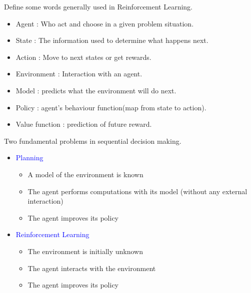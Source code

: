 \documentclass[landscape]{article}
\def\tcb{\textcolor{blue}}
\begin{document}
\newpage
\newvgtitle{\tcb{Terminology}}
\LARGE
\vspace{-.5em}
Define some words generally used in Reinforcement Learning.
\begin{itemize}
    \item Agent : Who act and choose in a given problem situation.
    \item State : The information used to determine what happens next.
    \item Action : Move to next states or get rewards.
    \item Environment : Interaction with an agent.
    \item Model : predicts what the environment will do next.
    \item Policy : agent’s behaviour function(map from state to action).
    \item Value function : prediction of future reward.
\end{itemize}
\newpage
\newvgtitle{\tcb{Learning and Planning}}
\LARGE
\vspace{-.5em}
Two fundamental problems in sequential decision making.
\vspace{0.5cm}
\begin{itemize}
    \item \huge \tcb{Planning}
    \LARGE
    \begin{itemize}
        \item A model of the environment is known
        \item The agent performs computations with its model (without any external interaction)
        \item The agent improves its policy
    \end{itemize}
    \vspace{0.5cm}
    \item \huge \tcb{Reinforcement Learning}
    \LARGE
    \begin{itemize}
        \item The environment is initially unknown
        \item The agent interacts with the environment
        \item The agent improves its policy
    \end{itemize}
\end{itemize}
\end{document}

